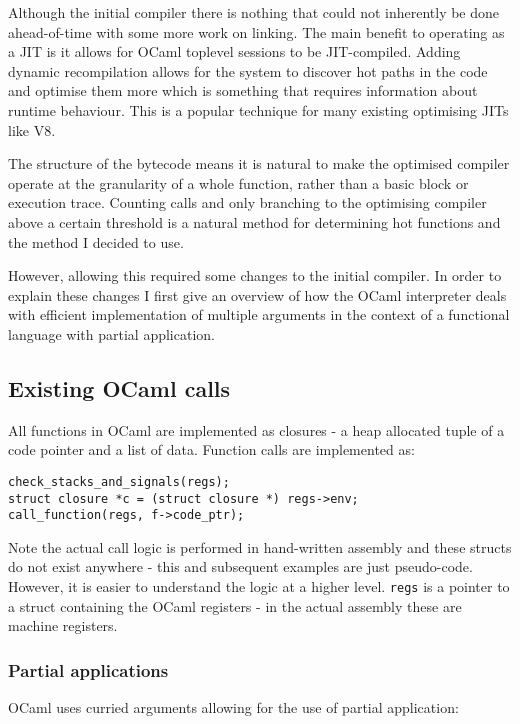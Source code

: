 Although the initial compiler there is nothing that could not inherently be done ahead-of-time with
some more work on linking. The main benefit to operating as a JIT is it allows for OCaml toplevel
sessions to be JIT-compiled. Adding dynamic recompilation allows for the system to discover hot
paths in the code and optimise them more which is something that requires information about runtime
behaviour. This is a popular technique for many existing optimising JITs like V8.

The structure of the bytecode means it is natural to make the optimised compiler operate at the
granularity of a whole function, rather than a basic block or execution trace. Counting calls and
only branching to the optimising compiler above a certain threshold is a natural method for
determining hot functions and the method I decided to use.

However, allowing this required some changes to the initial compiler. In order to explain these
changes I first give an overview of how the OCaml interpreter deals with efficient
implementation of multiple arguments in the context of a functional language with partial
application.

\subsection{Existing OCaml calls} \label{exist-ocaml}

All functions in OCaml are implemented as closures - a heap allocated tuple of a code pointer and a
list of data. Function calls are implemented as:

\begin{verbatim}
check_stacks_and_signals(regs);
struct closure *c = (struct closure *) regs->env;
call_function(regs, f->code_ptr);
\end{verbatim}

Note the actual call logic is performed in hand-written assembly and these structs do not exist
anywhere
- this and subsequent examples are just pseudo-code. However, it is easier to understand the logic
at a higher level. \texttt{regs} is a pointer to a struct containing the OCaml registers - in the
actual assembly these are machine registers.

\subsubsection{Partial applications}

OCaml uses curried arguments allowing for the use of partial application:

